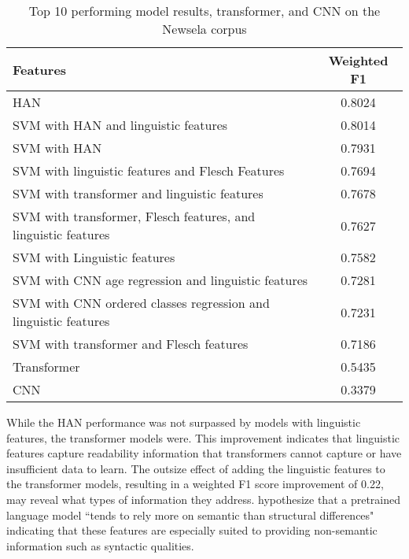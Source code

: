 \documentclass[11pt,a4paper]{article}
\theoremstyle{definition}
\begin{document}

\begin{table}
\begin{tabular}{p{5cm}c}
Features & Weighted F1\\
\hline
\rowcolor{han} HAN & 0.8024 \\
\rowcolor{han} SVM with HAN and linguistic features & 0.8014 \\
\rowcolor{han} SVM with HAN & 0.7931 \\
\rowcolor{nondeep} SVM with linguistic features and Flesch Features & 0.7694 \\
\rowcolor{transformer} SVM with transformer and linguistic features & 0.7678 \\
\rowcolor{transformer} SVM with transformer, Flesch features, and linguistic features & 0.7627 \\
\rowcolor{nondeep} SVM with Linguistic features & 0.7582 \\
\rowcolor{cnn} SVM with CNN age regression and linguistic features & 0.7281 \\
\rowcolor{cnn} SVM with CNN ordered classes regression and linguistic features & 0.7231 \\
\rowcolor{transformer} SVM with transformer and Flesch features & 0.7186 \\\hline\hline
\rowcolor{transformer} Transformer & 0.5435 \\
\rowcolor{cnn} CNN & 0.3379 \\
\end{tabular}
    \caption{Top 10 performing model results, transformer, and CNN on the Newsela corpus}
    \label{tab:NewselaBest}
\end{table}

While the HAN performance was not surpassed by models with linguistic features, the transformer models were. This improvement indicates that linguistic features capture readability information that transformers cannot capture or have insufficient data to learn. The outsize effect of adding the linguistic features to the transformer models, resulting in a weighted F1 score improvement of 0.22, may reveal what types of information they address. \citet{martincSupervisedUnsupervisedNeural2019} hypothesize that a pretrained language model ``tends to rely more on semantic than structural differences" indicating that these features are especially suited to providing non-semantic information such as syntactic qualities.
\end{document}
